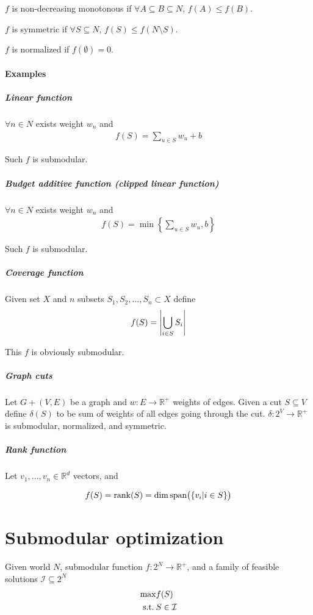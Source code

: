 \begin{definition}
	$f$ is non-decreasing monotonous if $\forall A\subseteq B \subseteq N$, $f(A) \leq f(B)$.
\end{definition}

\begin{definition}
	$f$ is symmetric if $\forall S \subseteq N$, $f(S) \leq f(N\setminus S)$.
\end{definition}
\begin{definition}
$f$ is normalized if $f(\emptyset) = 0$.
\end{definition}

\paragraph{Examples}
\subparagraph{Linear function}
$\forall n\in N$ exists weight $w_n$ and 
\begin{align}
f(S) = \sum_{u \in S} w_u + b
\end{align} 

Such $f$ is submodular.
\subparagraph{Budget additive function (clipped linear function)}
$\forall n\in N$ exists weight $w_n$ and 
\begin{align}
f(S) = \min \left\{ \sum_{u \in S} w_u,  b \right\}
\end{align} 

Such $f$ is submodular.

\subparagraph{Coverage function}
Given set $X$ and $n$ subsets $S_1, S_2, \dots, S_n \subset X$ define
\begin{align}
f(S) = \abs{\bigcup_{i \in S} S_i}
\end{align}

This $f$ is obviously submodular.

\subparagraph{Graph cuts}
Let $G+(V,E)$ be a graph and $w: E\to \mathbb{R}^+$ weights of edges. Given a cut $S\subseteq V$ define $\delta(S)$ to be sum of weights of all edges going through the cut. $\delta : 2^V \to \mathbb{R}^+$ is submodular, normalized, and symmetric.


\subparagraph{Rank function}
Let $v_1, \dots, v_n \in \mathbb{R}^d$ vectors, and 

\begin{align}
f(S) = \rank (S) = \dim \text{span} \qty\big( \left\{ v_i | i \in S\right\} )
\end{align}


\section{Submodular optimization}
Given world $N$, submodular function $f: 2^N \to \mathbb{R}^+$, and a family of feasible solutions $\mathcal{I} \subseteq 2^N$
\begin{align}
\max & f(S)\\
\text{s.t.} \: & S\in \mathcal{I}
\end{align}

